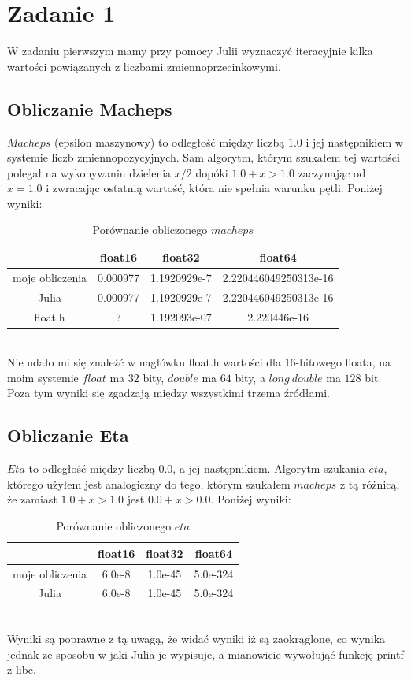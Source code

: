 \documentclass{article}
\begin{document}

\section*{Zadanie 1}
W zadaniu pierwszym mamy przy pomocy Julii wyznaczyć
iteracyjnie kilka wartości powiązanych z liczbami zmiennoprzecinkowymi.
\subsection*{Obliczanie Macheps}
$Macheps$ (epsilon maszynowy) to odległość między liczbą $1.0$ i jej następnikiem
w systemie liczb zmiennopozycyjnych.
Sam algorytm, którym szukałem tej wartości polegał na wykonywaniu dzielenia $x / 2$ dopóki
$1.0 + x > 1.0$ zaczynając od $x = 1.0$ i zwracając ostatnią wartość, która nie spełnia
warunku pętli. Poniżej wyniki:
\begin{table}[h]
    \centering
    \begin{tabular}{|c|c|c|c|}
      \hline
      & float16 & float32 & float64 \\
      \hline
      moje obliczenia &0.000977&1.1920929e-7&2.220446049250313e-16\\
      \hline
      Julia &0.000977&1.1920929e-7&2.220446049250313e-16\\
      \hline
      float.h &?&1.192093e-07&2.220446e-16\\
      \hline
    \end{tabular}
    \caption{Porównanie obliczonego $macheps$}
  \end{table}\\
Nie udało mi się znaleźć w nagłówku float.h wartości dla 16-bitowego floata,
na moim systemie $float$ ma $32$ bity, $double$ ma $64$ bity, a $long\ double$ ma $128$ bit.
Poza tym wyniki się zgadzają między wszystkimi trzema źródłami.
\subsection*{Obliczanie Eta}
$Eta$ to odległość między liczbą 0.0, a jej następnikiem.
Algorytm szukania $eta$, którego użyłem jest analogiczny do tego, którym
szukałem $macheps$ z tą różnicą, że zamiast $1.0 + x > 1.0$ jest $0.0 + x > 0.0$. 
Poniżej wyniki:
\begin{table}[h]
    \centering
    \begin{tabular}{|c|c|c|c|}
      \hline
      & float16 & float32 & float64 \\
      \hline
      moje obliczenia &6.0e-8&1.0e-45&5.0e-324\\
      \hline
      Julia &6.0e-8&1.0e-45&5.0e-324\\
      \hline
    \end{tabular}
    \caption{Porównanie obliczonego $eta$}
  \end{table}\\
Wyniki są poprawne z tą uwagą, że widać wyniki iż są zaokrąglone,
co wynika jednak ze sposobu w jaki Julia
je wypisuje, a mianowicie wywołująć funkcję printf z libc.
\end{document}
